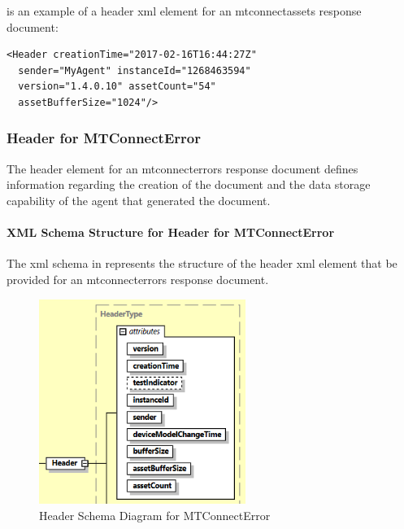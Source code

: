 \documentclass{mtconnect}	%
\begin{document}
 is an example of a \gls{header} \gls{xml} element for an \gls{mtconnectassets response document}:

\begin{lstlisting}[firstnumber=1,escapechar=|,%
caption={Example of Header XML Element for MTConnectAssets}, label={lst:header-xml-element-for-mtconnectassets}]
<Header creationTime="2017-02-16T16:44:27Z"
  sender="MyAgent" instanceId="1268463594"
  version="1.4.0.10" assetCount="54"
  assetBufferSize="1024"/>
\end{lstlisting}

\subsubsection{Header for MTConnectError}
\label{sec:Header for MTConnectError}

The \gls{header} element for an \gls{mtconnecterrors response document} defines information regarding the creation of the document and the data storage capability of the \gls{agent} that generated the document.  

\paragraph{XML Schema Structure for Header for MTConnectError}\mbox{}

The \gls{xml schema} in  represents the structure of the \gls{header} \gls{xml} element that \MUST be provided for an \gls{mtconnecterrors response document}.  

\begin{figure}[ht]
  \centering
  \includegraphics[width=0.6\textwidth]{figures/header-schema-diagram-for-mtconnecterror.png}
  \caption{Header Schema Diagram for MTConnectError}
  \label{fig:header-schema-diagram-for-mtconnecterror}
\end{figure}
\end{document}
